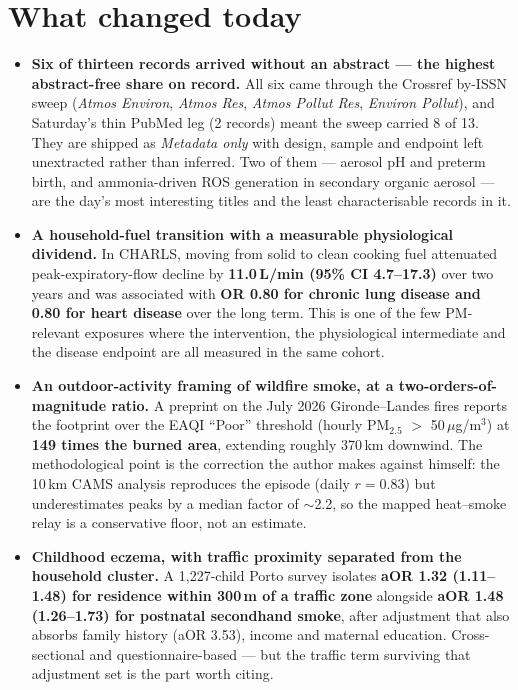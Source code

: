 \documentclass[10pt]{article}
\begin{document}
\section*{\sffamily\bfseries\color{Deep}What changed today}
\vspace{-1.5mm}{\color{Amber}\rule{\linewidth}{1.1pt}}\vspace{2.5mm}

\footnotesize
\begin{itemize}
\item \textbf{Six of thirteen records arrived without an abstract --- the highest
abstract-free share on record.} All six came through the Crossref by-ISSN sweep
(\textit{Atmos Environ}, \textit{Atmos Res}, \textit{Atmos Pollut Res},
\textit{Environ Pollut}), and Saturday's thin PubMed leg (2 records) meant the sweep
carried 8 of 13. They are shipped as \textit{Metadata only} with design, sample and
endpoint left unextracted rather than inferred. Two of them --- aerosol pH and preterm
birth, and ammonia-driven ROS generation in secondary organic aerosol --- are the day's
most interesting titles and the least characterisable records in it.

\item \textbf{A household-fuel transition with a measurable physiological dividend.}
In CHARLS, moving from solid to clean cooking fuel attenuated peak-expiratory-flow decline
by \textbf{11.0\,L/min (95\% CI 4.7--17.3)} over two years and was associated with
\textbf{OR 0.80 for chronic lung disease and 0.80 for heart disease} over the long term.
This is one of the few PM-relevant exposures where the intervention, the physiological
intermediate and the disease endpoint are all measured in the same cohort.

\item \textbf{An outdoor-activity framing of wildfire smoke, at a two-orders-of-magnitude
ratio.} A preprint on the July 2026 Gironde--Landes fires reports the footprint over the
EAQI ``Poor'' threshold (hourly PM$_{2.5}$ $>$ 50\,$\mu$g/m$^3$) at \textbf{149 times the
burned area}, extending roughly 370\,km downwind. The methodological point is the
correction the author makes against himself: the 10\,km CAMS analysis reproduces the
episode (daily $r = 0.83$) but underestimates peaks by a median factor of $\sim$2.2, so
the mapped heat--smoke relay is a conservative floor, not an estimate.

\item \textbf{Childhood eczema, with traffic proximity separated from the household
cluster.} A 1{,}227-child Porto survey isolates \textbf{aOR 1.32 (1.11--1.48) for
residence within 300\,m of a traffic zone} alongside \textbf{aOR 1.48 (1.26--1.73) for
postnatal secondhand smoke}, after adjustment that also absorbs family history
(aOR 3.53), income and maternal education. Cross-sectional and questionnaire-based ---
but the traffic term surviving that adjustment set is the part worth citing.


\end{itemize}
\end{document}

